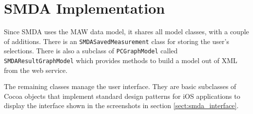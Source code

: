 \section{SMDA Implementation}
\label{sect:smda_implementation}

Since SMDA uses the MAW data model, it shares all model classes, with a couple
of additions. There is an \texttt{SMDASavedMeasurement} class for storing the
user's selections. There is also a subclass of \texttt{PCGraphModel} called
\texttt{SMDAResultGraphModel} which provides methods to build a model out of XML
from the web service.

The remaining classes manage the user interface. They are basic subclasses of
Cocoa objects that implement standard design patterns for iOS applications to
display the interface shown in the screenshots in section
\ref{sect:smda_interface}.
